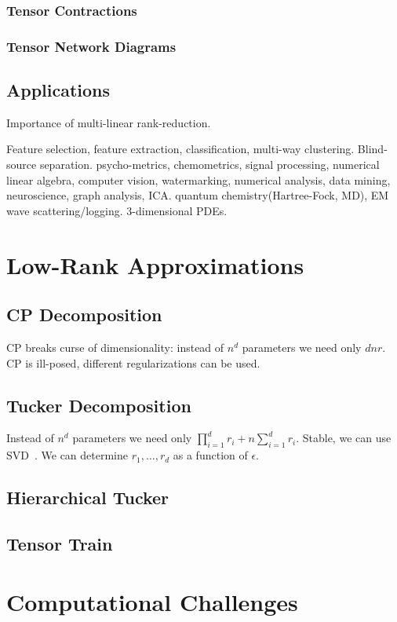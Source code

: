 \documentclass[10pt]{article}
\begin{document}
\subsubsection{Tensor Contractions}
\subsubsection{Tensor Network Diagrams}
\subsection{Applications}
Importance of multi-linear rank-reduction.

Feature selection, feature extraction, classification, multi-way clustering.
Blind-source separation. 
psycho-metrics, chemometrics, signal processing, numerical linear algebra, computer vision, watermarking, numerical analysis, data mining, neuroscience, graph analysis, ICA.
quantum chemistry(Hartree-Fock, MD), EM wave scattering/logging. 3-dimensional PDEs. 
\section{Low-Rank Approximations}

\subsection{CP Decomposition}
CP breaks curse of dimensionality: instead of $n^d$ parameters we need only $dnr$.
CP is ill-posed, different regularizations can be used.
\subsection{Tucker Decomposition}
Instead of $n^d$ parameters we need only $\prod_{i=1}^d r_i + n\sum_{i=1}^d r_i$.
Stable, we can use SVD~\cite{Lathauwer00amultilinear}.
We can determine $r_1, \dots, r_d$ as a function of $\epsilon$.
\subsection{Hierarchical Tucker}
\subsection{Tensor Train}
\section{Computational Challenges}
\end{document}
